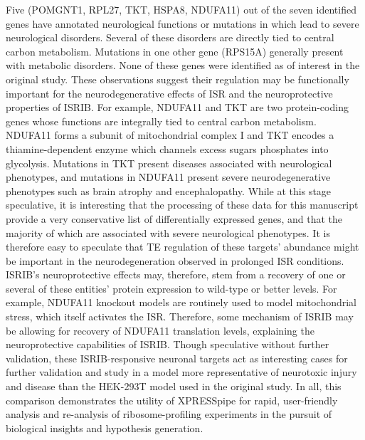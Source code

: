 \documentclass[10pt, oneside]{article}
\begin{document}
Five (POMGNT1, RPL27, TKT, HSPA8, NDUFA11) out of the seven identified genes have annotated neurological functions or mutations in which lead to severe neurological disorders. Several of these disorders are directly tied to central carbon metabolism. Mutations in one other gene (RPS15A) generally present with metabolic disorders. None of these genes were identified as of interest in the original study. These observations suggest their regulation may be functionally important for the neurodegenerative effects of ISR and the neuroprotective properties of ISRIB. For example, NDUFA11 and TKT are two protein-coding genes whose functions are integrally tied to central carbon metabolism. NDUFA11 forms a subunit of mitochondrial complex I and TKT encodes a thiamine-dependent enzyme which channels excess sugars phosphates into glycolysis. Mutations in TKT present diseases associated with neurological phenotypes, and mutations in NDUFA11 present severe neurodegenerative phenotypes such as brain atrophy and encephalopathy. While at this stage speculative, it is interesting that the processing of these data for this manuscript provide a very conservative list of differentially expressed genes, and that the majority of which are associated with severe neurological phenotypes. It is therefore easy to speculate that TE regulation of these targets' abundance might be important in the neurodegeneration observed in prolonged ISR conditions. ISRIB's neuroprotective effects may, therefore, stem from a recovery of one or several of these entities' protein expression to wild-type or better levels. For example, NDUFA11 knockout models are routinely used to model mitochondrial stress, which itself activates the ISR. Therefore, some mechanism of ISRIB may be allowing for recovery of NDUFA11 translation levels, explaining the neuroprotective capabilities of ISRIB. Though speculative without further validation, these ISRIB-responsive neuronal targets act as interesting cases for further validation and study in a model more representative of neurotoxic injury and disease than the HEK-293T model used in the original study. In all, this comparison demonstrates the utility of XPRESSpipe for rapid, user-friendly analysis and re-analysis of ribosome-profiling experiments in the pursuit of biological insights and hypothesis generation.\\
\end{document}
